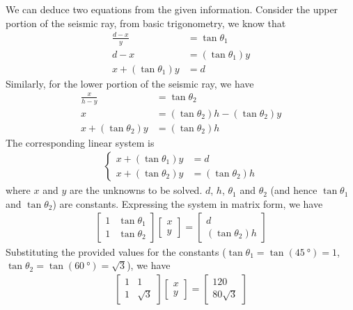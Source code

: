 \begin{solution}
We can deduce two equations from the given information. Consider the upper portion of the seismic ray, from basic trigonometry, we know that 
\begin{align*}
\frac{d-x}{y} &= \tan \theta_1 \\
d-x &= (\tan\theta_1) y \\
x + (\tan\theta_1) y &= d
\end{align*}
Similarly, for the lower portion of the seismic ray, we have
\begin{align*}
\frac{x}{h-y} &= \tan \theta_2 \\
x &= (\tan \theta_2) h - (\tan\theta_2) y \\
x + (\tan\theta_2) y &= (\tan \theta_2) h
\end{align*}
The corresponding linear system is
\begin{align*}
\begin{cases}
x + (\tan\theta_1) y &= d \\
x + (\tan\theta_2) y &= (\tan \theta_2) h
\end{cases}
\end{align*}
where $x$ and $y$ are the unknowns to be solved. $d$, $h$, $\theta_1$ and $\theta_2$ (and hence $\tan\theta_1$ and $\tan\theta_2$) are constants. Expressing the system in matrix form, we have
\begin{align*}
\begin{bmatrix}
1 & \tan\theta_1 \\
1 & \tan\theta_2
\end{bmatrix}
\begin{bmatrix}
x \\
y
\end{bmatrix}
=
\begin{bmatrix}
d \\
(\tan \theta_2) h
\end{bmatrix}
\end{align*}
Substituting the provided values for the constants ($\tan\theta_1 = \tan(\SI{45}{\degree}) = 1$, $\tan\theta_2 = \tan(\SI{60}{\degree}) = \sqrt{3}$), we have
\begin{align*}
\begin{bmatrix}
1 & 1 \\
1 & \sqrt{3}
\end{bmatrix}
\begin{bmatrix}
x \\
y
\end{bmatrix}
=
\begin{bmatrix}
120 \\
80\sqrt{3}
\end{bmatrix}
\end{align*}
\end{solution}

